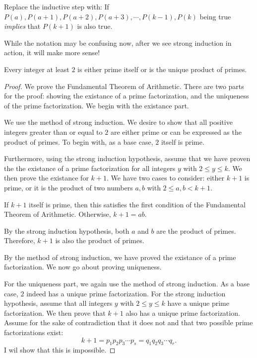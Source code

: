 \clearpage
\begin{defi} Replace the inductive step with: If $P(a), P(a+1), P(a+2), P(a+3), \cdots, P(k-1), P(k)$ being true \textit{implies} that $P(k+1)$ is also true.  \end{defi}
While the notation may be confusing now, after we see strong induction in action, it will make more sense!

\begin{theorem} Every integer at least $2$ is either prime itself or is the unique product of primes. \end{theorem}

\begin{proof} We prove the Fundamental Theorem of Arithmetic. There are two parts for the proof: showing the existance of a prime factorization, and the uniqueness of the prime factorization. We begin with the \color{blue} existance part.  
	
\color{black} We use the method of strong induction. We desire to show that all positive integers greater than or equal to $2$ are either prime or can be expressed as the product of primes. To begin with, as a \color{ForestGreen} base case, \color{black} $2$ itself is prime. 

Furthermore, using the \color{ForestGreen} strong induction hypothesis, \color{black} assume that we have proven the the existance of a prime factorization for all integers $y$ with $2\le y\le k$. We then prove the existance for $k+1$. We have two cases to consider: either $k+1$ is prime, or it is the product of two numbers $a,b$ with $2\le a,b<k+1$. 

If $k+1$ itself is prime, then this satisfies the first condition of the Fundamental Theorem of Arithmetic. Otherwise, $k+1=ab$. 

By the strong induction hypothesis, \color{black} both $a$ and $b$ are the product of primes. Therefore, $k+1$ is also the product of primes.

By the method of strong induction, we have proved the existance of a prime factorization. We now go about proving uniqueness. 

For the \color{blue} uniqueness part\color{black}, we again use the method of strong induction. As a \color{ForestGreen} base case, \color{black} $2$ indeed has a unique prime factorization. For the \color{ForestGreen} strong induction hypothesis, \color{black} assume that all integers $y$ with $2\le y\le k$ have a unique prime factorization. We then prove that $k+1$ also has a unique prime factorization. Assume for the sake of contradiction that it does not and that two possible prime factorizations exist: $$k+1=p_1p_2p_3\cdots p_s=q_1q_2q_3\cdots q_r.$$ I wil show that this is impossible.


\end{proof}
